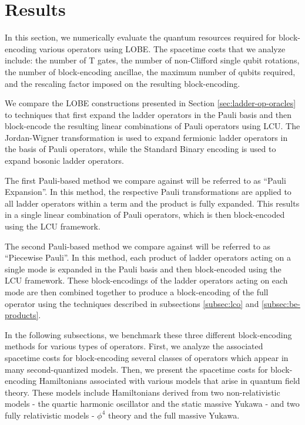 \section{Results}
\label{sec:results}

In this section, we numerically evaluate the quantum resources required for block-encoding various operators using LOBE.
The spacetime costs that we analyze include: the number of T gates, the number of non-Clifford single qubit rotations, the number of block-encoding ancillae, the maximum number of qubits required, and the rescaling factor imposed on the resulting block-encoding.

We compare the LOBE constructions presented in Section \ref{sec:ladder-op-oracles} to techniques that first expand the ladder operators in the Pauli basis and then block-encode the resulting linear combinations of Pauli operators using LCU.
The Jordan-Wigner transformation \cite{jordan-wigner} is used to expand fermionic ladder operators in the basis of Pauli operators, while the Standard Binary encoding \cite{standard-binary} is used to expand bosonic ladder operators.

The first Pauli-based method we compare against will be referred to as ``Pauli Expansion''.
In this method, the respective Pauli transformations are applied to all ladder operators within a term and the product is fully expanded.
This results in a single linear combination of Pauli operators, which is then block-encoded using the LCU framework.

The second Pauli-based method we compare against will be referred to as ``Piecewise Pauli''.
In this method, each product of ladder operators acting on a single mode is expanded in the Pauli basis and then block-encoded using the LCU framework.
These block-encodings of the ladder operators acting on each mode are then combined together to produce a block-encoding of the full operator using the techniques described in subsections \ref{subsec:lco} and \ref{subsec:be-products}.

In the following subsections, we benchmark these three different block-encoding methods for various types of operators.
First, we analyze the associated spacetime costs for block-encoding several classes of operators which appear in many second-quantized models.
Then, we present the spacetime costs for block-encoding Hamiltonians associated with various models that arise in quantum field theory.
These models include Hamiltonians derived from two non-relativistic models - the quartic harmonic oscillator and the static massive Yukawa - and two fully relativistic models - $\phi^4$ theory and the full massive Yukawa.

